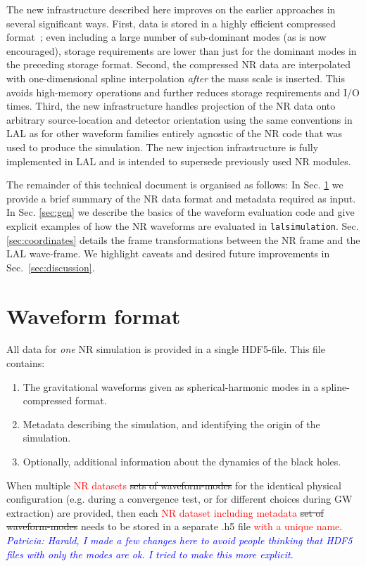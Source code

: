 \documentclass[11pt,tightenlines,article,amssymb,amsmath,amsfonts,superscriptaddress,nofootinbib]{revtex4}
\newcommand{\red}{\textcolor{red}}
\newcommand{\patricia}[1]{\textcolor{blue}{\textit{Patricia: #1}}}
\begin{document}
The new infrastructure described here improves on the earlier approaches
in several significant ways. First, data is stored in a highly efficient compressed format~\cite{Galley:2016mvy}; even including a large number of sub-dominant modes (as is now encouraged), storage requirements are lower than just for the dominant modes in the preceding storage format.  
Second, the compressed NR data are interpolated with one-dimensional spline interpolation \emph{after} the mass scale is inserted. This avoids high-memory operations and further reduces storage requirements and I/O times. Third, the new infrastructure handles projection of the NR data onto arbitrary source-location and detector orientation using the same conventions in LAL as for other waveform families entirely agnostic of the NR code that was used to produce the simulation. The new injection infrastructure is fully implemented in LAL and is intended to supersede previously used NR modules.

The remainder of this technical document is organised as follows: In Sec. \ref{sec:format} we provide a brief summary
of the NR data format and metadata required as input. In Sec. \ref{sec:gen} we describe the basics of the waveform evaluation code and give explicit examples of how the NR waveforms are evaluated in \texttt{lalsimulation}. Sec. \ref{sec:coordinates} details the frame transformations between the NR frame and the LAL wave-frame. We highlight caveats and desired future improvements in Sec.~\ref{sec:discussion}.

\section{Waveform format}
\label{sec:format}
All data for \emph{one} NR simulation is provided in a single HDF5-file.
  This file contains:
  \begin{enumerate}
    \item The gravitational waveforms given as spherical-harmonic
      modes in a spline-compressed format.
    \item Metadata describing the simulation, and identifying the
      origin of the simulation.
      \item Optionally, additional information about the dynamics of
        the black holes.
  \end{enumerate}
When multiple \red{NR datasets} \sout{sets of waveform-modes} for the
identical physical configuration (e.g. during a convergence test, or
for different choices during GW extraction) are provided, then each \red{NR dataset 
including metadata} \sout{set of
waveform-modes} needs to be stored in a separate .h5 file \red{with a unique name}.
\patricia{Harald, I made a few changes here to avoid people thinking that HDF5 files with
\emph{only} the modes are ok. I tried to make this more explicit.}
\end{document}
